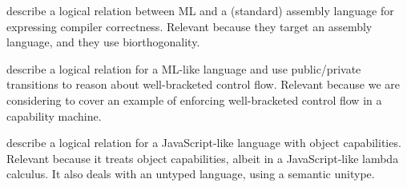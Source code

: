 \documentclass[a4paper]{article}
\begin{document}
\cite{Hur:2011:KLR:1926385.1926402} describe a logical relation between ML and
a (standard) assembly language for expressing compiler correctness.  Relevant
because they target an assembly language, and they use biorthogonality.

\cite{Dreyer:2010:IHS:1863543.1863566} describe a logical relation for a ML-like
language and use public/private transitions to reason about well-bracketed
control flow. Relevant because we are considering to cover an example of
enforcing well-bracketed control flow in a capability machine.

\cite{Devriese:2016ObjCap} describe a logical relation for a JavaScript-like
language with object capabilities.  Relevant because it treats object
capabilities, albeit in a JavaScript-like lambda calculus. It also deals with an
untyped language, using a semantic unitype.



\end{document}
